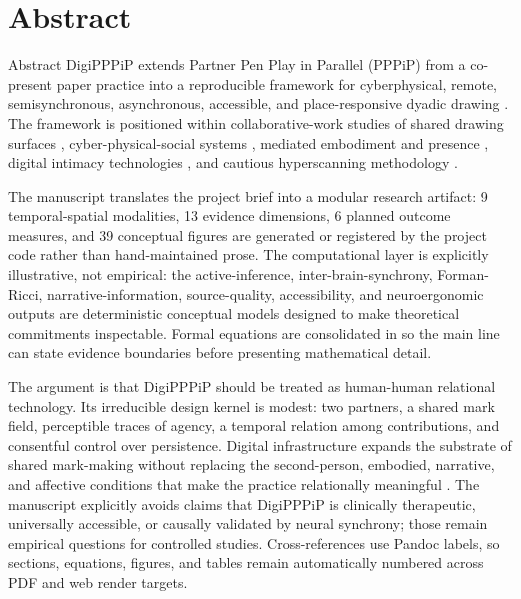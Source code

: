 \documentclass[
  ignorenonframetext,
]{beamer}
\author{\texorpdfstring{}{}}
\date{}
\begin{document}
\section{Abstract}\label{sec:abstract}

\begin{frame}[allowframebreaks]{Abstract}
DigiPPPiP extends Partner Pen Play in Parallel (PPPiP) from a co-present
paper practice into a reproducible framework for cyberphysical, remote,
semisynchronous, asynchronous, accessible, and place-responsive dyadic
drawing . The framework is positioned within
collaborative-work studies of shared drawing surfaces
, cyber-physical-social systems
, mediated embodiment and presence
, digital intimacy technologies
, and cautious
hyperscanning methodology .

The manuscript translates the project brief into a modular research
artifact: 9 temporal-spatial modalities, 13 evidence dimensions, 6
planned outcome measures, and 39 conceptual figures are generated or
registered by the project code rather than hand-maintained prose. The
computational layer is explicitly illustrative, not empirical: the
active-inference, inter-brain-synchrony, Forman-Ricci,
narrative-information, source-quality, accessibility, and neuroergonomic
outputs are deterministic conceptual models designed to make theoretical
commitments inspectable. Formal equations are consolidated in
 so the main line can state evidence
boundaries before presenting mathematical detail.

The argument is that DigiPPPiP should be treated as human-human
relational technology. Its irreducible design kernel is modest: two
partners, a shared mark field, perceptible traces of agency, a temporal
relation among contributions, and consentful control over persistence.
Digital infrastructure expands the substrate of shared mark-making
without replacing the second-person, embodied, narrative, and affective
conditions that make the practice relationally meaningful
. The manuscript explicitly avoids claims
that DigiPPPiP is clinically therapeutic, universally accessible, or
causally validated by neural synchrony; those remain empirical questions
for controlled studies. Cross-references use Pandoc labels, so sections,
equations, figures, and tables remain automatically numbered across PDF
and web render targets.
\end{frame}
\end{document}
